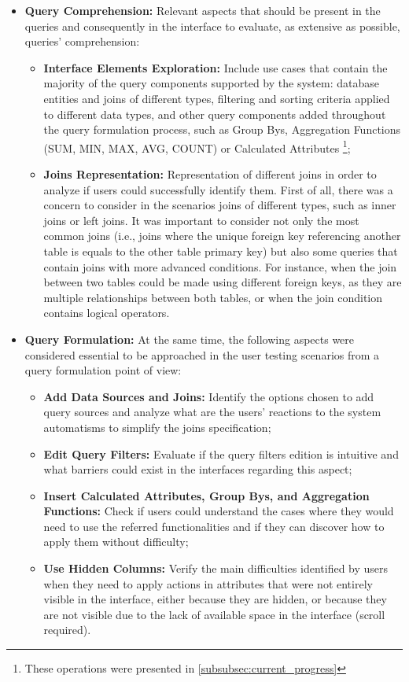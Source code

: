 \begin{itemize}
    \item \textbf{Query Comprehension: }Relevant aspects that should be present in the queries and consequently in the interface to evaluate, as extensive as possible, queries' comprehension:
    \begin{itemize}
        \item \textbf{Interface Elements Exploration: }Include use cases that contain the majority of the query components supported by the system: database entities and joins of different types, filtering and sorting criteria applied to different data types, and other query components added throughout the query formulation process, such as Group Bys, Aggregation Functions (SUM, MIN, MAX, AVG, COUNT) or Calculated Attributes \footnote{These operations were presented in \ref{subsubsec:current_progress}};
        \item \textbf{Joins Representation: }Representation of different joins in order to analyze if users could successfully identify them. First of all, there was a concern to consider in the scenarios joins of different types, such as inner joins or left joins. It was important to consider not only the most common joins (i.e., joins where the unique foreign key referencing another table is equals to the other table primary key) but also some queries that contain joins with more advanced conditions. For instance, when the join between two tables could be made using different foreign keys, as they are multiple relationships between both tables, or when the join condition contains logical operators.
    \end{itemize}
    \item \textbf{Query Formulation: }At the same time, the following aspects were considered essential to be approached in the user testing scenarios from a query formulation point of view:
    \begin{itemize}
        \item \textbf{Add Data Sources and Joins: }Identify the options chosen to add query sources and analyze what are the users' reactions to the system automatisms to simplify the joins specification;
        \item \textbf{Edit Query Filters: }Evaluate if the query filters edition is intuitive and what barriers could exist in the interfaces regarding this aspect;
        \item \textbf{Insert Calculated Attributes, Group Bys, and Aggregation Functions: }Check if users could understand the cases where they would need to use the referred functionalities and if they can discover how to apply them without difficulty;
        \item \textbf{Use Hidden Columns: }Verify the main difficulties identified by users when they need to apply actions in attributes that were not entirely visible in the interface, either because they are hidden, or because they are not visible due to the lack of available space in the interface (scroll required).
    \end{itemize}
\end{itemize}

